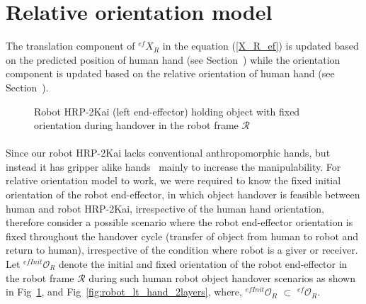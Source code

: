 \documentclass[a4paper, 12pt, oneside]{Thesis}  %
\begin{document}
\clearpage

\section{Relative orientation model}\label{relOri}
The translation component of ${}^{ef}{X}_R $ in the equation (\ref{X_R_ef}) is updated based on the predicted position of human hand (see Section~) while the orientation component is updated based on the relative orientation of human hand (see Section~).

\begin{figure}[ht]
	\caption{Robot HRP-2Kai (left end-effector) holding object with fixed orientation during handover in the robot frame $\mathcal{R}$}
	\label{fig:robot_lt_hand_obj}
\end{figure} 

\paragraph*{}
Since our robot HRP-2Kai lacks conventional anthropomorphic hands, but instead it has gripper alike hands~\cite{kaneko2015humanoid, stasse2019overview} mainly to increase the manipulability. For relative orientation model to work, we were required to know the fixed initial orientation of the robot end-effector, in which object handover is feasible between human and robot HRP-2Kai, irrespective of the human hand orientation, therefore consider a possible  scenario where the robot end-effector orientation is fixed throughout the handover cycle (transfer of object from human to robot and return to human), irrespective of the condition where robot is a giver or receiver. Let ${{}^{efInit}\mathcal{O}_R}$ denote the initial and fixed orientation of the robot end-effector in the robot frame $\mathcal{R}$ during such human robot object handover scenarios as shown in Fig~\ref{fig:robot_lt_hand_obj}, and Fig~\ref{fig:robot_lt_hand_2layers}, where, ${{}^{efInit}\mathcal{O}_R}$ $\subset$ ${{}^{ef}\mathcal{O}_R}$.
\end{document}
